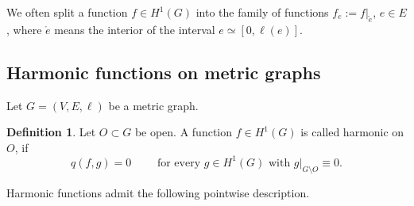 \documentclass[reqno]{amsart}
\theoremstyle{plain}
\theoremstyle{definition}
\newtheorem{defn}[thm]{Definition}
\theoremstyle{remark}
\numberwithin{equation}{section}
\begin{document}
		
We often split a function $f \in H^1(G)$ into the family of functions $f_e := f\big|_{\mathring{e}}$, $e \in E$, where $\mathring{e}$ means the interior of the interval $e\simeq [0, \ell(e)]$.


\subsection{Harmonic functions on metric graphs}
Let $G= (V,E, \ell)$ be a metric graph.
\begin{defn}
	Let $O\subset G$ be open. A function $f \in H^1(G)$ is called harmonic on $O$, if
	\[
	q(f,g) = 0 \qquad \text{ for every } g \in H^1(G) \text{ with } g|_{G \setminus O} \equiv 0.  
	\]
\end{defn}

Harmonic functions admit the following pointwise description.
\end{document}
